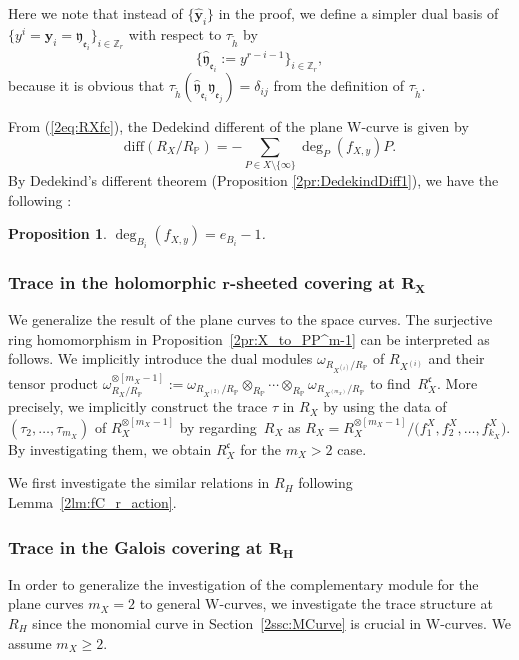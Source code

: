 \documentclass[10pt,a4paper]{amsart}
\def\ZZ{{\mathbb Z}}
\def\PP{{\mathbb P}}
\def\bby{{\mathbf y}}
\def\fc{{\mathfrak c}}
\def\fe{{\mathfrak e}}
\def\fy{{\mathfrak y}}
\def\th{{\widetilde h}}
\def\hfy{{\widehat{\mathfrak y}}}
\def\hby{\widehat {{\mathbf y}}}
\def\diff{\mathrm{diff}}
\numberwithin{equation}{section}
\newtheorem{Proposition}[Theorem]{Proposition}
 { \theoremstyle{definition}
\newtheorem{Definition}[Theorem]{Definition}
\newtheorem{Note}[Theorem]{Note}
\newtheorem{Example}[Theorem]{Example}
\newtheorem{Remark}[Theorem]{Remark} }
\begin{document}
\begin{Remark}\label{2rmk:hetam=2}
Here we note that instead of $\{\hby_i\}$ in the proof, we define a simpler dual basis of $\{y^i =\bby_i = \fy_{\fe_i}\}_{i\in \ZZ_r}$ with respect to $\tau_\th$ by
\[
\big\{\hfy_{\fe_i}:=y^{r-i-1}\big\}_{i \in \ZZ_r},
\]
because it is obvious that
$\tau_\th(\hfy_{\fe_i}\fy_{\fe_j})=\delta_{ij}$ from the definition of $\tau_\th$.
\end{Remark}

From (\ref{2eq:RXfc}), the Dedekind different of the plane W-curve is given by
\[
\diff(R_X/R_\PP)=-\sum_{P\in X\setminus\{\infty\}}\deg_P(f_{X,y}) P.
\]
By Dedekind's different theorem (Proposition \ref{2pr:DedekindDiff1}), we have the following \cite[Chapter 15]{Kunz2004}:
\begin{Proposition}\label{2pr:DedekindDiff2}
$\deg_{B_i}(f_{X,y})=e_{B_i}-1$.
\end{Proposition}

\subsubsection[Trace in the holomorphic r-sheeted covering at R\_X]{Trace in the holomorphic $\boldsymbol{r}$-sheeted covering at $\boldsymbol{R_X}$}\label{2sec:Trace_RX1}

We generalize the result of the plane curves to the space curves.
The surjective ring homomorphism in Proposition~\ref{2pr:X_to_PP^m-1} can be interpreted as follows.
We implicitly introduce the dual modules $\omega_{R_{X^{(i)}}/R_\PP}$ of $R_{X^{(i)}}$ and their tensor product $\omega_{R_X/R_\PP}^{\otimes[m_X-1]}:=\omega_{R_{X^{(2)}}/R_\PP}\otimes_{R_\PP}\cdots\otimes_{R_\PP}\omega_{R_{X^{(m_X)}}/R_\PP}$ to find~$R_X^\fc$.
More precisely, we implicitly construct the trace $\tau$ in $R_X$ by using the data of $(\tau_2, \dots, \tau_{m_X})$ of $R_X^{\otimes[m_X-1]}$ by regarding~$R_X$ as $R_X=R_X^{\otimes[m_X-1]}/\big(f^X_1, f^X_2, \dots, f^X_{k_X}\big)$.
By investigating them, we obtain $R_X^\fc$ for the $m_X>2$ case.

We first investigate the similar relations in $R_{H}$ following Lemma~\ref{2lm:fC_r_action}.

\subsubsection[Trace in the Galois covering at R\_H]{Trace in the Galois covering at $\boldsymbol{R_{H}}$}\label{2sec:Trace_RH}

In order to generalize the investigation of the complementary module for the plane curves $m_X=2$ to general W-curves, we investigate the trace structure at $R_{H}$ since the monomial curve in Section~\ref{2ssc:MCurve} is crucial in W-curves.
We assume $m_X\ge 2$.
\end{document}
